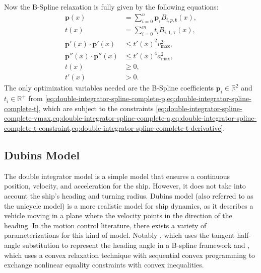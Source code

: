 Now the B-Spline relaxation is fully given by the following equations:
\begin{subequations}\label{eq:double-integrator-spline-complete}
    \begin{align}
        \mathbf{p}(x) &= \sum_{i=0}^{n} \mathbf{p}_i B_{i,p,\mathbf{t}}(x), \label{eq:double-integrator-spline-complete-p} \\
        t(x) &= \sum_{i=0}^{m} t_i B_{i,1,\boldsymbol{\tau}}(x), \label{eq:double-integrator-spline-complete-t} \\
        \mathbf{p}'(x) \cdot \mathbf{p}'(x) &\leq t'(x)^2v_{\max}^2, \label{eq:double-integrator-spline-complete-vmax} \\
        \mathbf{p}''(x) \cdot \mathbf{p}''(x) &\leq t'(x)^4a_{\max}^2, \label{eq:double-integrator-spline-complete-a} \\
        t(x) &\geq 0, \label{eq:double-integrator-spline-complete-t-constraint} \\
        t'(x) &> 0. \label{eq:double-integrator-spline-complete-t-derivative} \end{align}
\end{subequations}
The only optimization variables needed are the B-Spline coefficients $\mathbf{p}_i\in\mathbb{R}^2$ and $t_i\in\mathbb{R}^+$ from \cref{eq:double-integrator-spline-complete-p,eq:double-integrator-spline-complete-t}, which are subject to the constraints \cref{eq:double-integrator-spline-complete-vmax,eq:double-integrator-spline-complete-a,eq:double-integrator-spline-complete-t-constraint,eq:double-integrator-spline-complete-t-derivative}.


\subsection{Dubins Model}\label{sec:dubins-model}

The double integrator model is a simple model that ensures a continuous position, velocity, and acceleration for the ship. However, it does not take into account the ship's heading and turning radius. Dubins model (also referred to as the unicycle model) is a more realistic model for ship dynamics, as it describes a vehicle moving in a plane where the velocity points in the direction of the heading. In the motion control literature, there exists a variety of parameterizations for this kind of model. Notably \citet{mercy2017spline}, which uses the tangent half-angle substitution to represent the heading angle in a B-spline framework and \citet{Wang2020}, which uses a convex relaxation technique with sequential convex programming to exchange nonlinear equality constraints with convex inequalities. 


